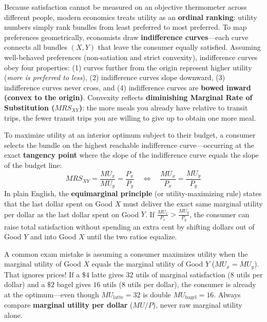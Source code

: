 \documentclass[11pt,letterpaper]{article}
\begin{document}
Because satisfaction cannot be measured on an objective thermometer across different people, modern economics treats utility as an \textbf{ordinal ranking}: utility numbers simply rank bundles from least preferred to most preferred. To map preferences geometrically, economists draw \textbf{indifference curves}—each curve connects all bundles $(X, Y)$ that leave the consumer equally satisfied. Assuming well-behaved preferences (non-satiation and strict convexity), indifference curves obey four properties: (1) curves further from the origin represent higher utility (\emph{more is preferred to less}), (2) indifference curves slope downward, (3) indifference curves never cross, and (4) indifference curves are \textbf{bowed inward (convex to the origin)}. Convexity reflects \textbf{diminishing Marginal Rate of Substitution ($MRS_{XY}$)}: the more meals you already have relative to transit trips, the fewer transit trips you are willing to give up to obtain one more meal.

To maximize utility at an interior optimum subject to their budget, a consumer selects the bundle on the highest reachable indifference curve—occurring at the exact \textbf{tangency point} where the slope of the indifference curve equals the slope of the budget line:
\begin{equation}
MRS_{XY} = \frac{MU_x}{MU_y} = \frac{P_x}{P_y} \quad \Longleftrightarrow \quad \frac{MU_x}{P_x} = \frac{MU_y}{P_y}
\end{equation}
In plain English, the \textbf{equimarginal principle} (or utility-maximizing rule) states that the last dollar spent on Good $X$ must deliver the exact same marginal utility per dollar as the last dollar spent on Good $Y$. If $\frac{MU_x}{P_x} > \frac{MU_y}{P_y}$, the consumer can raise total satisfaction without spending an extra cent by shifting dollars out of Good $Y$ and into Good $X$ until the two ratios equalize.

\begin{tcolorbox}[colback=LightTerracotta,colframe=CourseOrange,title=\textbf{Clear It Up: Why Maximizing Utility Does NOT Mean $MU_x = MU_y$}]
A common exam mistake is assuming a consumer maximizes utility when the marginal utility of Good $X$ equals the marginal utility of Good $Y$ ($MU_x = MU_y$). That ignores prices! If a $\$4$ latte gives $32$ utils of marginal satisfaction ($8$ utils per dollar) and a $\$2$ bagel gives $16$ utils ($8$ utils per dollar), the consumer is already at the optimum—even though $MU_{\text{latte}} = 32$ is double $MU_{\text{bagel}} = 16$. Always compare \textbf{marginal utility per dollar} ($MU / P$), never raw marginal utility alone.
\end{tcolorbox}
\end{document}
